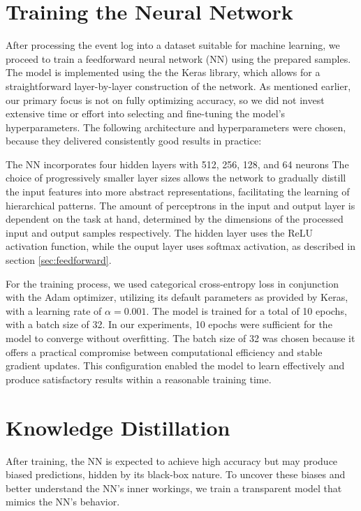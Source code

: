 \section{Training the Neural Network}
\label{sec:training}
After processing the event log into a dataset suitable for machine learning,
we proceed to train a feedforward neural network (NN) using the prepared samples.
The model is implemented using the the Keras \cite{keras} library,
which allows for a straightforward layer-by-layer construction of the network.
As mentioned earlier, our primary focus is not on fully optimizing accuracy,
so we did not invest extensive time or effort into selecting and fine-tuning the model's hyperparameters.
The following architecture and hyperparameters were chosen, because they delivered consistently good results in practice:

The NN incorporates four hidden layers with 512, 256, 128, and 64 neurons
The choice of progressively smaller layer sizes allows the network to gradually distill
the input features into more abstract representations, facilitating the learning of hierarchical patterns. 
The amount of perceptrons in the input and output layer is dependent on the task at hand,
determined by the dimensions of the processed input and output samples respectively.
The hidden layer uses the ReLU activation function,
while the ouput layer uses softmax activation, as described in section \ref{sec:feedforward}.

For the training process, we used categorical cross-entropy loss in conjunction with the Adam optimizer,
utilizing its default parameters as provided by Keras, with a learning rate of $\alpha = 0.001$.
The model is trained for a total of 10 epochs, with a batch size of 32.
In our experiments, 10 epochs were sufficient for the model to converge without overfitting.
The batch size of 32 was chosen because it offers a practical compromise
between computational efficiency and stable gradient updates.
This configuration enabled the model to learn effectively
and produce satisfactory results within a reasonable training time.

\section{Knowledge Distillation}
After training, the NN is expected to achieve high accuracy but may produce biased predictions,
hidden by its black-box nature.
To uncover these biases and better understand the NN's inner workings,
we train a transparent model that mimics the NN's behavior.


